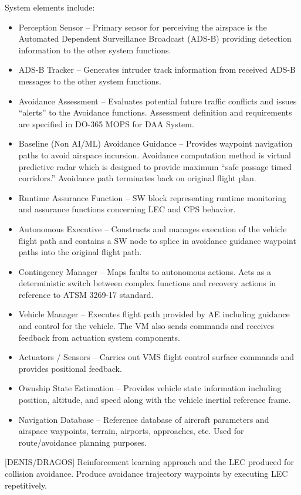 System elements include: 
\begin{itemize}
\item Perception Sensor – Primary sensor for perceiving the airspace is the Automated Dependent Surveillance Broadcast (ADS-B) providing detection information to the other system functions.
\item ADS-B Tracker – Generates intruder track information from received ADS-B messages to the other system functions.
\item Avoidance Assessment – Evaluates potential future traffic conflicts and issues “alerts” to the Avoidance functions.  Assessment definition and requirements are specified in DO-365 MOPS for DAA System.
\item Baseline (Non AI/ML) Avoidance Guidance – Provides waypoint navigation paths to avoid airspace incursion.  Avoidance computation method is virtual predictive radar which is designed to provide maximum “safe passage timed corridors.”  Avoidance path terminates back on original flight plan.
\item Runtime Assurance Function – SW block representing runtime monitoring and assurance functions concerning LEC and CPS behavior.
\item Autonomous Executive – Constructs and manages execution of the vehicle flight path and contains a SW node to splice in avoidance guidance waypoint paths into the original flight path.
\item Contingency Manager – Maps faults to autonomous actions.  Acts as a deterministic switch between complex functions and recovery actions in reference to ATSM 3269-17 standard.
\item Vehicle Manager – Executes flight path provided by AE including guidance and control for the vehicle.  The VM also sends commands and receives feedback from actuation system components.
\item Actuators / Sensors – Carries out VMS flight control surface commands and provides positional feedback.
\item Ownship State Estimation – Provides vehicle state information including position, altitude, and speed along with the vehicle inertial reference frame.
\item Navigation Database – Reference database of aircraft parameters and airspace waypoints, terrain, airports, approaches, etc.  Used for route/avoidance planning purposes.
\end{itemize}

[DENIS/DRAGOS] Reinforcement learning approach and the LEC produced for collision avoidance.  
Produce avoidance trajectory waypoints  by executing LEC repetitively. 
